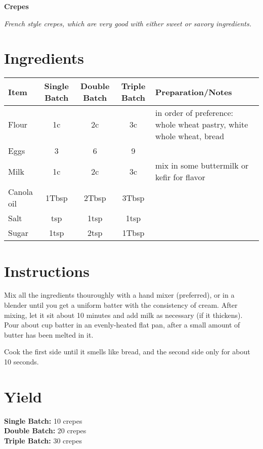 \documentclass{/home/luke/Reference/Code/Source/latex-python/usr/local/lib/latex_python/recipes/examples/Crepes}
\begin{document}
    \begin{center}
        {\Large \textbf{Crepes}}
        
        \small\emph{French style crepes, which are very good with either sweet or savory ingredients.}
    \end{center}
    
    \section*{Ingredients}
    \begin{center}
        
            \begin{tabular}{l c c c l}
                \textbf{Item} & \textbf{Single Batch} & \textbf{Double Batch} & \textbf{Triple Batch} & \textbf{Preparation/Notes} \\
                \hline
                Flour & 1c & 2c & 3c & \parbox[t]{0.4\textwidth}{in order of preference: whole wheat pastry, white whole wheat, bread} \\
Eggs & 3 & 6 & 9 & \parbox[t]{0.4\textwidth}{} \\
Milk & 1c & 2c & 3c & \parbox[t]{0.4\textwidth}{mix in some buttermilk or kefir for flavor} \\
Canola oil & 1Tbsp & 2Tbsp & 3Tbsp & \parbox[t]{0.4\textwidth}{} \\
Salt & tsp & 1tsp & 1tsp & \parbox[t]{0.4\textwidth}{} \\
Sugar & 1tsp & 2tsp & 1Tbsp & \parbox[t]{0.4\textwidth}{}
            \end{tabular}
        
    \end{center}
    
    \section*{Instructions}
    Mix all the ingredients thouroughly with a hand mixer (preferred), or in a blender
until you get a uniform batter with the consistency of cream. After mixing,
let it sit about 10 minutes and add milk as necessary (if it thickens).
Pour about  cup batter in an evenly-heated flat pan, after a small amount of
butter has been melted in it.

Cook the first side until it smells like bread,
and the second side only for about 10 seconds.
    
    \section*{Yield}
    \textbf{Single Batch:} 10 crepes \\
\textbf{Double Batch:} 20 crepes \\
\textbf{Triple Batch:} 30 crepes
\end{document}
